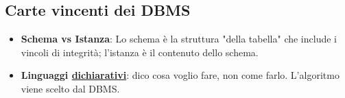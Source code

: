 \documentclass[12pt]{article}
\begin{document}
\subsection{Carte vincenti dei DBMS}
\begin{itemize}
    \item \textbf{Schema vs Istanza}: Lo schema è la struttura "della tabella" che include i vincoli di integrità; l'istanza è il contenuto dello schema.
    \item \textbf{Linguaggi \uline{dichiarativi}}: dico cosa voglio fare, non come farlo. L'algoritmo viene scelto dal DBMS.
\end{itemize}
\end{document}
